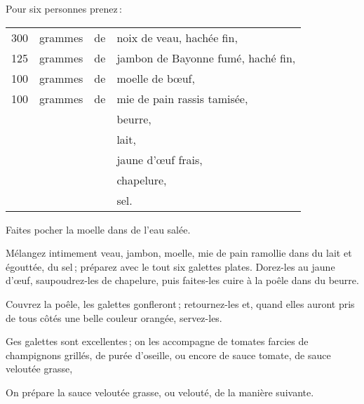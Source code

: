 Pour six personnes prenez :

\medskip

\footnotesize
\begin{longtable}{rrrp{16em}}
    300 & grammes & de & noix de veau, hachée fin,                                                        \\
    125 & grammes & de & jambon de Bayonne fumé, haché fin,                                               \\
    100 & grammes & de & moelle de bœuf,                                                                  \\
    100 & grammes & de & mie de pain rassis tamisée,                                                      \\
        &         &    & beurre,                                                                          \\
        &         &    & lait,                                                                            \\
        &         &    & jaune d'œuf frais,                                                               \\
        &         &    & chapelure,                                                                       \\
        &         &    & sel.                                                                             \\
\end{longtable}
\normalsize

Faites pocher la moelle dans de l'eau salée.

Mélangez intimement veau, jambon, moelle, mie de pain ramollie dans du lait et
égouttée, du sel ; préparez avec le tout six galettes plates. Dorez-les au
jaune d'œuf, saupoudrez-les de chapelure, puis faites-les cuire à la poêle dans
du beurre.

Couvrez la poêle, les galettes gonfleront ; retournez-les et, quand elles
auront pris de tous côtés une belle couleur orangée, servez-les.

Ges galettes sont excellentes ; on les accompagne de tomates farcies de
champignons grillés, de purée d'oseille, ou encore de sauce tomate, de sauce
veloutée grasse,

\sk

On prépare la sauce veloutée grasse, ou velouté, de la manière suivante.

\medskip

